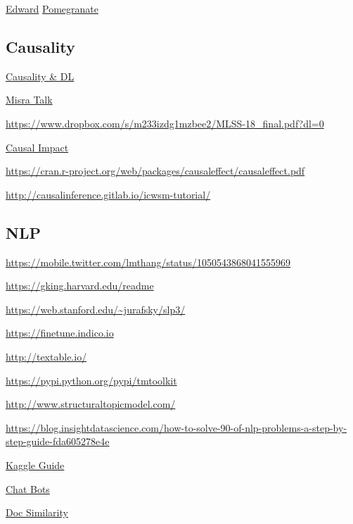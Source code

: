 \documentclass[]{book}
\begin{document}
\href{http://edwardlib.org/}{Edward} \textbar{}
\href{http://pomegranate.readthedocs.io/en/latest/}{Pomegranate}

\subsection{Causality}\label{causality}

\href{https://twitter.com/tdietterich/status/1034631407904018437}{Causality
\& DL}

\href{https://pages.dataiku.com/hubfs/PDF/Meetup-Presentation/06-18_Stress-Testing_Mishra.pdf?t=1532033314245\&utm_campaign=US\%20Event\%20Meetup\%20NYU\%20NYC\%20July\%202018\&utm_source=hs_email\&utm_medium=email\&utm_content=64589348\&_hsenc=p2ANqtz-9_41UxxLKzauP5Gf5bbRh63DzcsGFL8hMuW8HH8a_a1AeS9zaESqO-PoTbCkzXirAvWBJnHgvb-PEi_l7ds9IWg_y25H7xE2uVhBib3XwWmO68PBI\&_hsmi=64589348}{Misra
Talk}

\url{https://www.dropbox.com/s/m233izdg1mzbee2/MLSS-18_final.pdf?dl=0}

\href{https://google.github.io/CausalImpact/}{Causal Impact}

\url{https://cran.r-project.org/web/packages/causaleffect/causaleffect.pdf}

\url{http://causalinference.gitlab.io/icwsm-tutorial/}

\subsection{NLP}\label{nlp}

\url{https://mobile.twitter.com/lmthang/status/1050543868041555969}

\url{https://gking.harvard.edu/readme}

\url{https://web.stanford.edu/~jurafsky/slp3/}

\url{https://finetune.indico.io}

\url{http://textable.io/}

\url{https://pypi.python.org/pypi/tmtoolkit}

\url{http://www.structuraltopicmodel.com/}

\url{https://blog.insightdatascience.com/how-to-solve-90-of-nlp-problems-a-step-by-step-guide-fda605278e4e}

\href{https://t.co/Zcnd7EJKsn}{Kaggle Guide}

\href{https://rasa.ai/}{Chat Bots}

\href{http://brandonrose.org/clustering}{Doc Similarity}
\end{document}
